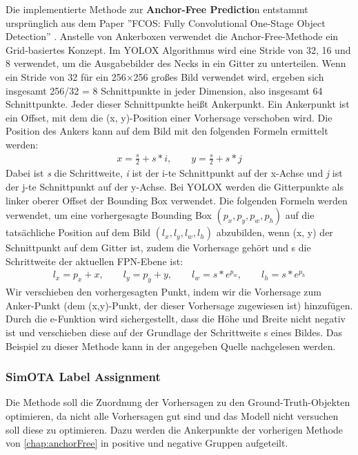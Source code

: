 Die implementierte Methode zur \textbf{Anchor-Free Predictio}n entstammt ursprünglich aus dem Paper ''FCOS: Fully Convolutional One-Stage Object Detection'' \cite{yoloxAnchorFree}. Anstelle von Ankerboxen verwendet die Anchor-Free-Methode ein Grid-basiertes Konzept. Im YOLOX Algorithmus wird eine Stride von 32, 16 und 8 verwendet, um die Ausgabebilder des Necks in ein Gitter zu unterteilen. Wenn ein Stride von 32 für ein 256×256 großes Bild verwendet wird, ergeben sich insgesamt 256/32 = 8 Schnittpunkte in jeder Dimension, also insgesamt 64 Schnittpunkte. Jeder dieser Schnittpunkte heißt Ankerpunkt. Ein Ankerpunkt ist ein Offset, mit dem die (x, y)-Position einer Vorhersage verschoben wird. Die Position des Ankers kann auf dem Bild mit den folgenden Formeln ermittelt werden:
\begin{align}
	x = \frac{s}{2} + s*i, \qquad y = \frac{s}{2} + s*j
\end{align}
Dabei ist \textit{s} die Schrittweite, \textit{i} ist der i-te Schnittpunkt auf der x-Achse und \textit{j} ist der j-te Schnittpunkt auf der y-Achse. Bei YOLOX werden die Gitterpunkte als linker oberer Offset der Bounding Box verwendet. Die folgenden Formeln werden verwendet, um eine vorhergesagte Bounding Box $(p_x, p_y, p_w, p_h)$ auf die tatsächliche Position auf dem Bild $(l_x, l_y, l_w, l_h)$ abzubilden, wenn (x, y) der Schnittpunkt auf dem Gitter ist, zudem die Vorhersage gehört und s die Schrittweite der aktuellen FPN-Ebene ist:
\begin{align}
	l_x=p_x+x, \qquad l_y=p_y+y, \qquad l_w=s*e^{p_w}, \qquad l_h=s*e^{p_h}
\end{align}
Wir verschieben den vorhergesagten Punkt, indem wir die Vorhersage zum Anker-Punkt (dem (x,y)-Punkt, der dieser Vorhersage zugewiesen ist) hinzufügen. Durch die e-Funktion wird sichergestellt, dass die Höhe und Breite nicht negativ ist und verschieben diese auf der Grundlage der Schrittweite s eines Bildes. Das Beispiel zu dieser Methode kann in der angegeben Quelle nachgelesen werden. \cite{yoloxExplanationHowWorks}


\subsubsection{SimOTA Label Assignment}\label{chap:simota}
Die Methode soll die Zuordnung der Vorhersagen zu den Ground-Truth-Objekten optimieren, da nicht alle Vorhersagen gut sind und das Modell nicht versuchen soll diese zu optimieren. Dazu werden die Ankerpunkte der vorherigen Methode von \ref{chap:anchorFree} in positive und negative Gruppen aufgeteilt.

